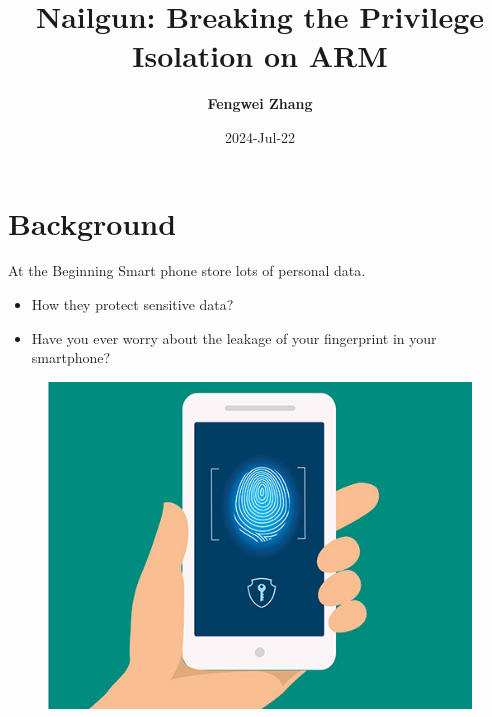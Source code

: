 \documentclass{beamer}
\title{Nailgun: Breaking the Privilege Isolation on ARM}
\author{\textbf{Fengwei Zhang} \\\vspace{3pt}}
\institute{GOSSIP Summer Camp\\ \vspace{5pt}}
\date{2024-Jul-22}
\begin{document}
\kaishu
\begin{frame}
    \titlepage
    \begin{figure}[htbp]
        \begin{center}
        \end{center}
    \end{figure}
\end{frame}

\begin{frame}
    \tableofcontents[sectionstyle=show,subsectionstyle=show/shaded/hide,subsubsectionstyle=show/shaded/hide]
\end{frame}

\section{Background}

\begin{frame}{At the Beginning}
    Smart phone store lots of personal data. 
    \begin{itemize}
        \item How they protect sensitive data?
        \item Have you ever worry about the leakage of your fingerprint in your smartphone?
    \end{itemize}
    \begin{figure}
        \centering
        \includegraphics[scale=.30]{SUSTech-Beamer-Theme/pic/smartphone-security.jpg}
        \label{fig:my_label}
    \end{figure}
\end{frame}
\end{document}

